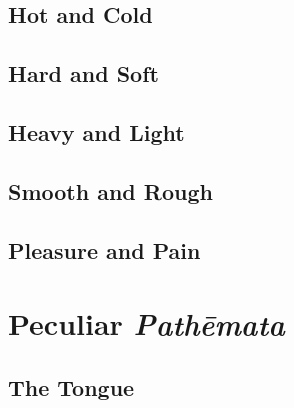 \subsection{Hot and Cold} %
\label{sub:hot_and_cold}




\subsection{Hard and Soft} %
\label{sub:hard_and_soft}




\subsection{Heavy and Light} %
\label{sub:heavy_and_light}




\subsection{Smooth and Rough} %
\label{sub:smooth_and_rough}




\subsection{Pleasure and Pain} %
\label{sub:pleasure_and_pain}






\section{Peculiar \emph{Pathēmata}} %
\label{sec:peculiar_emph_pathemata}

\subsection{The Tongue} %
\label{sub:the_tongue}




